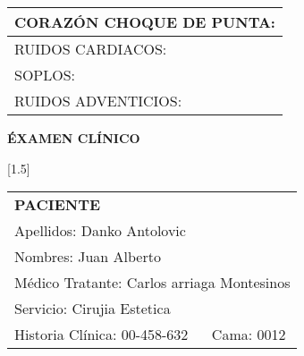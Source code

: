 \documentclass[10pt,a4paper]{article}
\begin{document}
{\begin{tabular}{|p{2.8cm}p{2.8cm}p{2.8cm}p{2.8cm}|}
\hline
\multicolumn{4}{|l|}{\begin{minipage}[t]{12.5 cm}\scriptsize{CORAZ\'ON CHOQUE DE PUNTA: }\end{minipage}}\\
\hline
\multicolumn{4}{|l|}{\begin{minipage}[t]{12.5 cm}\scriptsize{RUIDOS CARDIACOS: }\end{minipage}}\\
\hline
\multicolumn{4}{|l|}{\begin{minipage}[t]{12.5 cm}\scriptsize{SOPLOS: }\end{minipage}}\\
\hline
\multicolumn{4}{|l|}{\begin{minipage}[t]{12.5 cm}\scriptsize{RUIDOS ADVENTICIOS: }\end{minipage}}\\
\hline
\end{tabular}}
\vspace{0.6cm}
\begin{flushleft}
\begin{LARGE}
\textbf{\'EXAMEN CL\'INICO}
\end{LARGE}
\end{flushleft}
\newpage
\hfill
\begin{minipage}{10cm}
\begin{flushleft}
\scalebox{1.4}[1.5]{
\begin{tabular}{|p{3cm}p{2.3cm}|}
\hline 
\multicolumn{2}{|l|}{\scriptsize{\textbf{PACIENTE}}}\\
\multicolumn{2}{|p{5.3cm}|}{\scriptsize{Apellidos: Danko Antolovic}}\\ 
\multicolumn{2}{|p{5.3cm}|}{\scriptsize{Nombres: Juan Alberto}}\\ 
\multicolumn{2}{|p{5.3cm}|}{\scriptsize{M\'edico Tratante: Carlos arriaga Montesinos}}\\ 
\hline 
\multicolumn{2}{|p{5.3cm}|}{\scriptsize{Servicio: Cirujia Estetica}}\\
\hline 
\scriptsize{Historia Cl\'inica: 00-458-632}&\scriptsize{Cama: 0012} \\ 
\hline 
\end{tabular}}
\end{flushleft}
\end{minipage}
\end{document}

